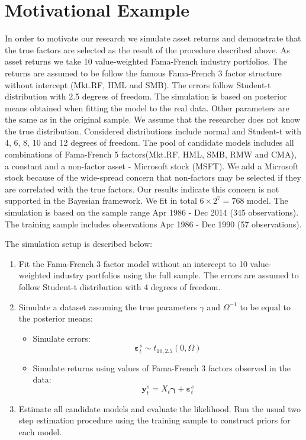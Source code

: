 
\section{Motivational Example}
In order to motivate our research we simulate asset returns and demonstrate that the true factors are selected as the result of the procedure described above. 
As asset returns we take 10 value-weighted Fama-French industry portfolios. 
The returns are assumed to be follow the famous Fama-French 3 factor structure without intercept (Mkt.RF, HML and SMB). 
The errors follow Student-t distribution with 2.5 degrees of freedom. 
The simulation is based on posterior means obtained when fitting the model to the real data. 
Other parameters are the same as in the original sample.
We assume that the researcher does not know the true distribution. 
Considered distributions include normal and Student-t with 4, 6, 8, 10 and 12 degrees of freedom. 
The pool of candidate models includes all combinations of Fama-French 5 factors(Mkt.RF, HML, SMB, RMW and CMA), a constant and a non-factor asset - Microsoft stock (MSFT). 
We add a Microsoft stock  because of the wide-spread concern that non-factors may be selected if they are correlated with the true factors.
Our results indicate this concern is not supported in the Bayesian framework. 
We fit in total $6\times 2^{7} = 768$ model. 
The simulation is based on the sample range Apr 1986 - Dec 2014 (345 observations). 
The training sample includes observations Apr 1986 - Dec 1990 (57 observations).

The simulation setup is described below:
\begin{enumerate}
	\item Fit the Fama-French 3 factor model without an intercept to 10 value-weighted industry portfolios using the full sample. The errors are assumed to follow Student-t distribution with 4 degrees of freedom. 
	\item Simulate a dataset assuming the true parameters  $\gamma$ and $\Omega^{-1} $ to be equal to the posterior means:
	\begin{itemize}
		\item Simulate errors:
		\begin{equation*}
		\boldsymbol{\varepsilon}^s_{t}\sim t_{10,2.5 }\left( 0,\Omega \right)
		\end{equation*}
		\item Simulate returns using values of Fama-French 3 factors observed in the data:
		\begin{equation*}
		\mathbf{y}_t^s = X_t \boldsymbol{\gamma} + \boldsymbol{\varepsilon}^s_t
		\end{equation*}
	\end{itemize}
	\item Estimate all candidate models and evaluate the likelihood. Run the usual two step estimation procedure using the training sample to construct priors for each model.
\end{enumerate}

